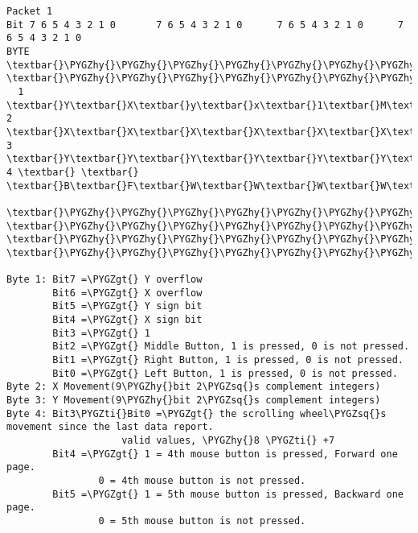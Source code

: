 \documentclass[a4paper,8pt,english]{sphinxmanual}
\def\PYGZgt{\char`\>}
\def\PYGZhy{\char`\-}
\def\PYGZsq{\char`\'}
\def\PYGZti{\char`\~}
\renewcommand\PYGZsq{\textquotesingle}
\begin{document}
\begin{Verbatim}[commandchars=\\\{\}]
Packet 1
Bit 7 6 5 4 3 2 1 0       7 6 5 4 3 2 1 0      7 6 5 4 3 2 1 0      7 6 5 4 3 2 1 0
BYTE  \textbar{}\PYGZhy{}\PYGZhy{}\PYGZhy{}\PYGZhy{}\PYGZhy{}\PYGZhy{}\PYGZhy{}\PYGZhy{}\PYGZhy{}\PYGZhy{}\PYGZhy{}\PYGZhy{}\PYGZhy{}\PYGZhy{}\PYGZhy{}\textbar{}BYTE \textbar{}\PYGZhy{}\PYGZhy{}\PYGZhy{}\PYGZhy{}\PYGZhy{}\PYGZhy{}\PYGZhy{}\PYGZhy{}\PYGZhy{}\PYGZhy{}\PYGZhy{}\PYGZhy{}\PYGZhy{}\PYGZhy{}\PYGZhy{}\textbar{}BYTE\textbar{}\PYGZhy{}\PYGZhy{}\PYGZhy{}\PYGZhy{}\PYGZhy{}\PYGZhy{}\PYGZhy{}\PYGZhy{}\PYGZhy{}\PYGZhy{}\PYGZhy{}\PYGZhy{}\PYGZhy{}\PYGZhy{}\PYGZhy{}\textbar{}BYTE\textbar{}\PYGZhy{}\PYGZhy{}\PYGZhy{}\PYGZhy{}\PYGZhy{}\PYGZhy{}\PYGZhy{}\PYGZhy{}\PYGZhy{}\PYGZhy{}\PYGZhy{}\PYGZhy{}\PYGZhy{}\PYGZhy{}\PYGZhy{}\textbar{}
  1   \textbar{}Y\textbar{}X\textbar{}y\textbar{}x\textbar{}1\textbar{}M\textbar{}R\textbar{}L\textbar{}  2  \textbar{}X\textbar{}X\textbar{}X\textbar{}X\textbar{}X\textbar{}X\textbar{}X\textbar{}X\textbar{}  3 \textbar{}Y\textbar{}Y\textbar{}Y\textbar{}Y\textbar{}Y\textbar{}Y\textbar{}Y\textbar{}Y\textbar{}  4 \textbar{} \textbar{} \textbar{}B\textbar{}F\textbar{}W\textbar{}W\textbar{}W\textbar{}W\textbar{}
      \textbar{}\PYGZhy{}\PYGZhy{}\PYGZhy{}\PYGZhy{}\PYGZhy{}\PYGZhy{}\PYGZhy{}\PYGZhy{}\PYGZhy{}\PYGZhy{}\PYGZhy{}\PYGZhy{}\PYGZhy{}\PYGZhy{}\PYGZhy{}\textbar{}     \textbar{}\PYGZhy{}\PYGZhy{}\PYGZhy{}\PYGZhy{}\PYGZhy{}\PYGZhy{}\PYGZhy{}\PYGZhy{}\PYGZhy{}\PYGZhy{}\PYGZhy{}\PYGZhy{}\PYGZhy{}\PYGZhy{}\PYGZhy{}\textbar{}    \textbar{}\PYGZhy{}\PYGZhy{}\PYGZhy{}\PYGZhy{}\PYGZhy{}\PYGZhy{}\PYGZhy{}\PYGZhy{}\PYGZhy{}\PYGZhy{}\PYGZhy{}\PYGZhy{}\PYGZhy{}\PYGZhy{}\PYGZhy{}\textbar{}    \textbar{}\PYGZhy{}\PYGZhy{}\PYGZhy{}\PYGZhy{}\PYGZhy{}\PYGZhy{}\PYGZhy{}\PYGZhy{}\PYGZhy{}\PYGZhy{}\PYGZhy{}\PYGZhy{}\PYGZhy{}\PYGZhy{}\PYGZhy{}\textbar{}

Byte 1: Bit7 =\PYGZgt{} Y overflow
        Bit6 =\PYGZgt{} X overflow
        Bit5 =\PYGZgt{} Y sign bit
        Bit4 =\PYGZgt{} X sign bit
        Bit3 =\PYGZgt{} 1
        Bit2 =\PYGZgt{} Middle Button, 1 is pressed, 0 is not pressed.
        Bit1 =\PYGZgt{} Right Button, 1 is pressed, 0 is not pressed.
        Bit0 =\PYGZgt{} Left Button, 1 is pressed, 0 is not pressed.
Byte 2: X Movement(9\PYGZhy{}bit 2\PYGZsq{}s complement integers)
Byte 3: Y Movement(9\PYGZhy{}bit 2\PYGZsq{}s complement integers)
Byte 4: Bit3\PYGZti{}Bit0 =\PYGZgt{} the scrolling wheel\PYGZsq{}s movement since the last data report.
                    valid values, \PYGZhy{}8 \PYGZti{} +7
        Bit4 =\PYGZgt{} 1 = 4th mouse button is pressed, Forward one page.
                0 = 4th mouse button is not pressed.
        Bit5 =\PYGZgt{} 1 = 5th mouse button is pressed, Backward one page.
                0 = 5th mouse button is not pressed.
\end{Verbatim}
\end{document}
